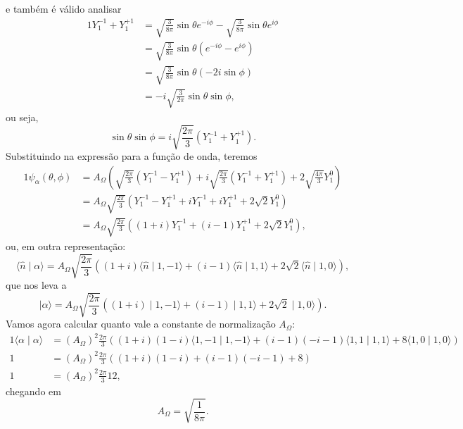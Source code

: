 \documentclass{article}
\newcommand{\ket}[1]{\mid\!\! #1 \rangle}
\newcommand{\braket}[2]{\langle #1 \!\mid\! #2 \rangle}
\begin{document}
e também é válido analisar
\begin{alignat}{1}
\nonumber
 Y^{-1}_{1} + Y^{+1}_{1} &= \sqrt{\frac{3}{8\pi}}\sin{\theta} e^{- i \phi} - \sqrt{\frac{3}{8\pi}}\sin{\theta} e^{ i \phi}\\ \nonumber
 &= \sqrt{\frac{3}{8\pi}}\sin{\theta} \left( e^{- i \phi} - e^{ i \phi} \right) \\ \nonumber
 &= \sqrt{\frac{3}{8\pi}}\sin{\theta} \left( - 2 i \sin{\phi} \right) \\
 &= - i \sqrt{\frac{3}{2\pi}} \sin{\theta}\sin{\phi} \mathrm{,}
\end{alignat}
ou seja,
\begin{equation}
 \sin{\theta}\sin{\phi} = i \sqrt{\frac{2 \pi}{3}} \left( Y^{-1}_{1} + Y^{+1}_{1} \right) \mathrm{.}
\end{equation}
Substituindo na expressão para a função de onda, teremos
\begin{alignat}{1}
 \psi_{\alpha}(\theta,\phi) &= A_{\Omega}\left(\sqrt{\frac{2 \pi}{3}} \left( Y^{-1}_{1} - Y^{+1}_{1} \right) +
 i \sqrt{\frac{2 \pi}{3}} \left( Y^{-1}_{1} + Y^{+1}_{1} \right) + 2\sqrt{\frac{4 \pi}{3}} Y^0_1\right) \\ \nonumber
 &= A_{\Omega}\sqrt{\frac{2 \pi}{3}}\left( Y^{-1}_{1} - Y^{+1}_{1} + i Y^{-1}_{1} + i Y^{+1}_{1} + 2\sqrt{2} Y^0_1\right) \\
 &= A_{\Omega}\sqrt{\frac{2 \pi}{3}}\left((1 + i) Y^{-1}_{1} + (i - 1) Y^{+1}_{1} + 2\sqrt{2} Y^0_1\right) \mathrm{,}
\end{alignat}
ou, em outra representação:
\begin{equation}
 \braket{\hat{n}}{\alpha}= A_{\Omega}\sqrt{\frac{2 \pi}{3}}\left((1 + i) \braket{\hat{n}}{1,-1} + (i - 1) \braket{\hat{n}}{1,1} +
 2\sqrt{2} \braket{\hat{n}}{1,0}\right)\mathrm{,}
\end{equation}
que nos leva a
\begin{equation}
 \ket{\alpha} = A_{\Omega}\sqrt{\frac{2 \pi}{3}}\left((1 + i) \ket{1,-1} + (i - 1) \ket{1,1} +
 2\sqrt{2} \ket{1,0}\right)\mathrm{.}
\end{equation}
Vamos agora calcular quanto vale a constante de normalização $A_{\Omega}$:
\begin{alignat}{1}
 \nonumber
 \braket{\alpha}{\alpha} &= (A_{\Omega})^2\frac{2 \pi}{3}\left((1 + i)(1 - i) \braket{1,-1}{1,-1} + (i - 1)(-i - 1) \braket{1,1}{1,1} +
 8 \braket{1,0}{1,0}\right) \\ \nonumber
 1 &= (A_{\Omega})^2\frac{2 \pi}{3}\left((1 + i)(1 - i) + (i - 1)(-i - 1) + 8 \right) \\ \nonumber
 1 &= (A_{\Omega})^2\frac{2 \pi}{3} 12\mathrm{,}
\end{alignat}
chegando em
\begin{equation}
 A_{\Omega} = \sqrt{\frac{1}{8 \pi}}\mathrm{.}
\end{equation}
\end{document}
